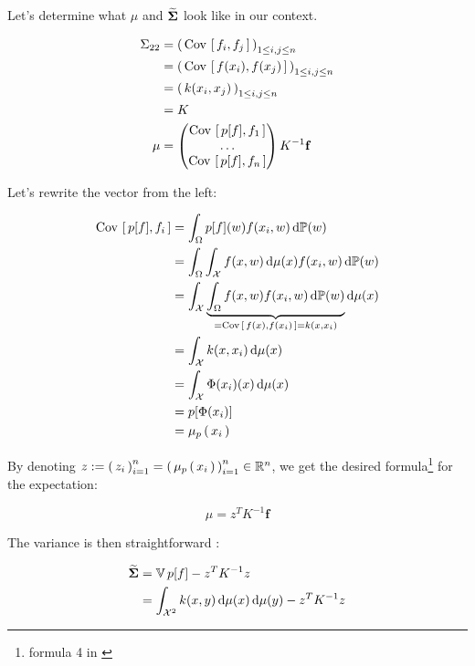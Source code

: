Let's determine what $\mu$ and $\mathbf{\widetilde{\Sigma}}$ look like in our context.
  \begin{boxcomputation}
\begin{align*}
  \Sigma _ { 22 } &= \left( \, \mathrm{Cov} \, \left[ \, f_i, f_j \, \right] \, \right)_{1 \leq i,j \leq n}\\
  &= \left( \, \mathrm{Cov} \, \left[ \, f(x_i), f(x_j) \, \right] \, \right)_{1 \leq i,j \leq n}\\
  &= \left( \, k(x_i, x_j) \, \right)_{1 \leq i,j \leq n}\\
  &= K\\
  \mu &= \begin{pmatrix}
    \mathrm{Cov} \, \left[ \, p[f], f_1 \, \right] \\ \ldots \\ \mathrm{Cov} \, \left[ \, p[f], f_n \, \right]\\
\end{pmatrix} K^{-1} \mathbf{f}
\end{align*}
\end{boxcomputation}
Let's rewrite the vector from the left:
\begin{boxcomputation}
\begin{align*}
\mathrm{Cov} \, \left[ \, p[f], f_i \, \right] &= \int_{\Omega} p[f](w) f(x_i, w) \mathop{}\mathopen{}\mathrm{d} \mathbb{P}(w)\\
&= \int_{\Omega} \int_{\mathcal{X}} f(x, w) \mathop{}\mathopen{}\mathrm{d} \mu(x) f(x_i, w) \mathop{}\mathopen{}\mathrm{d} \mathbb{P}(w)\\
&=  \int_{\mathcal{X}}  \underbrace{\int_{\Omega} f(x, w) f(x_i, w) \mathop{}\mathopen{}\mathrm{d} \mathbb{P}(w)}_{=\mathrm{Cov} \, \left[ \, f(x), f(x_i) \, \right]=k(x,x_i)} \mathop{}\mathopen{}\mathrm{d} \mu(x) \\
&= \int_{\mathcal{X}} k(x,x_i)\mathop{}\mathopen{}\mathrm{d} \mu(x)\\
&= \int_{\mathcal{X}} \Phi(x_i)(x) \mathop{}\mathopen{}\mathrm{d} \mu(x)\\
&= p[\Phi(x_i)]\\
&= \mu_p \left( \, x_i \, \right)\\
\end{align*}
\end{boxcomputation}

By denoting $z := \left( \, z_i \, \right)_{i=1}^n = \left( \, \mu_p \left( \, x_i \, \right) \, \right)_{i=1}^n \in \mathbb{R}^n$, we
 get the desired formula\footnote{formula 4 in \cite{FWBQ} } for the expectation:
 \begin{boxtheorem}
   \begin{equation}
     \mu = z ^ { T } K ^ { - 1 } \mathbf { f }
   \end{equation}
 \end{boxtheorem}

The variance is then straightforward :
\begin{boxexample}
  \begin{align*}
    \mathbf{\widetilde{\Sigma}} &= \mathbb{V} \,p[f] - z ^ { T } K ^ { - 1 } z\\
    &= \int_{\mathcal{X}^2}  k(x,y) \mathop{}\mathopen{}\mathrm{d} \mu(x) \mathop{}\mathopen{}\mathrm{d} \mu(y) - z ^ { T } K ^ { - 1 } z
  \end{align*}
\end{boxexample}

